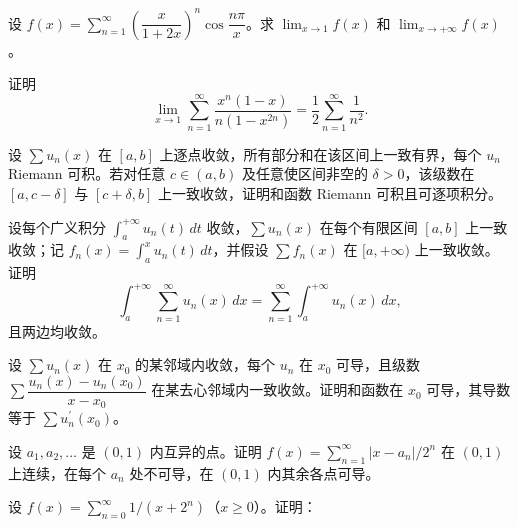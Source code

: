 \newpage
\noindent\begin{minipage}{\textwidth}
设 $f(x)=\sum_{n=1}^{\infty}\left(\dfrac{x}{1+2x}\right)^n\cos\dfrac{n\pi}x$。求 $\lim_{x\to1}f(x)$ 和 $\lim_{x\to+\infty}f(x)$。
\end{minipage}\par\vfill
\noindent\begin{minipage}{\textwidth}
证明\[\lim_{x\to1}\sum_{n=1}^{\infty}\frac{x^n(1-x)}{n(1-x^{2n})}=\frac12\sum_{n=1}^{\infty}\frac1{n^2}.\]
\end{minipage}\par\vfill
\noindent\begin{minipage}{\textwidth}
设 $\sum u_n(x)$ 在 $[a,b]$ 上逐点收敛，所有部分和在该区间上一致有界，每个 $u_n$ Riemann 可积。若对任意 $c\in(a,b)$ 及任意使区间非空的 $\delta>0$，该级数在 $[a,c-\delta]$ 与 $[c+\delta,b]$ 上一致收敛，证明和函数 Riemann 可积且可逐项积分。
\end{minipage}\par\vfill
\newpage
\noindent\begin{minipage}{\textwidth}
设每个广义积分 $\int_a^{+\infty}u_n(t)\,dt$ 收敛，$\sum u_n(x)$ 在每个有限区间 $[a,b]$ 上一致收敛；记 $f_n(x)=\int_a^xu_n(t)\,dt$，并假设 $\sum f_n(x)$ 在 $[a,+\infty)$ 上一致收敛。证明\[\int_a^{+\infty}\sum_{n=1}^{\infty}u_n(x)\,dx=\sum_{n=1}^{\infty}\int_a^{+\infty}u_n(x)\,dx,\]且两边均收敛。
\end{minipage}\par\vfill
\noindent\begin{minipage}{\textwidth}
设 $\sum u_n(x)$ 在 $x_0$ 的某邻域内收敛，每个 $u_n$ 在 $x_0$ 可导，且级数 $\sum\dfrac{u_n(x)-u_n(x_0)}{x-x_0}$ 在某去心邻域内一致收敛。证明和函数在 $x_0$ 可导，其导数等于 $\sum u_n^{\prime}(x_0)$。
\end{minipage}\par\vfill
\noindent\begin{minipage}{\textwidth}
设 $a_1,a_2,\ldots$ 是 $(0,1)$ 内互异的点。证明 $f(x)=\sum_{n=1}^{\infty}|x-a_n|/2^n$ 在 $(0,1)$ 上连续，在每个 $a_n$ 处不可导，在 $(0,1)$ 内其余各点可导。
\end{minipage}\par\vfill
\newpage
\noindent\begin{minipage}{\textwidth}
设 $f(x)=\sum_{n=0}^{\infty}1/(x+2^n)$（$x\ge0$）。证明：
\SubQ{1}{$f$ 在 $[0,+\infty)$ 上连续。}
\end{minipage}\par\vfill
